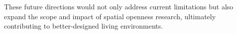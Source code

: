 
These future directions would not only address current limitations but also expand the scope and 
impact of spatial openness research, ultimately contributing to better-designed living environments.
